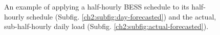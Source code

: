 \begin{figure}[htb]\centering
	\hspace{1mm}
	\caption{An example of applying a half-hourly BESS schedule to its half-hourly schedule (Subfig. \ref{ch2:subfig:day-forecasted}) and the actual, sub-half-hourly daily load (Subfig. \ref{ch2:subfig:actual-forecasted}).}
	\label{ch2:fig:cost-sample}
\end{figure}